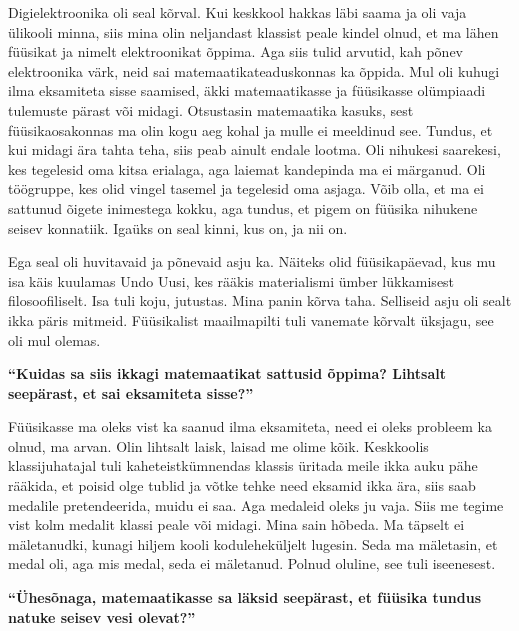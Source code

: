Digielektroonika oli seal kõrval. Kui keskkool hakkas läbi saama ja oli vaja ülikooli minna, siis mina olin neljandast klassist peale kindel olnud, et ma lähen füüsikat ja nimelt elektroonikat õppima. Aga siis tulid arvutid, kah põnev elektroonika värk, neid sai matemaatikateaduskonnas ka õppida. Mul oli kuhugi ilma eksamiteta sisse saamised, äkki matemaatikasse ja füüsikasse olümpiaadi tulemuste pärast või midagi. Otsustasin matemaatika kasuks, sest füüsikaosakonnas ma olin kogu aeg kohal ja mulle ei meeldinud see. Tundus, et kui midagi ära tahta teha, siis peab ainult endale lootma. Oli nihukesi saarekesi, kes tegelesid oma kitsa erialaga, aga laiemat kandepinda ma ei märganud. Oli töögruppe, kes olid vingel tasemel ja tegelesid oma asjaga. Võib olla, et ma ei sattunud õigete inimestega kokku, aga tundus, et pigem on füüsika nihukene seisev konnatiik. Igaüks on seal kinni, kus on, ja nii on. 

Ega seal oli huvitavaid ja põnevaid asju ka. Näiteks olid füüsikapäevad, kus mu isa käis kuulamas Undo Uusi, kes rääkis materialismi ümber lükkamisest filosoofiliselt. Isa tuli koju, jutustas. Mina panin kõrva taha. Selliseid asju oli sealt ikka päris mitmeid. Füüsikalist maailmapilti tuli vanemate kõrvalt üksjagu, see oli mul olemas. 

\textbf{\enquote{Kuidas sa siis ikkagi matemaatikat sattusid õppima? Lihtsalt seepärast, et sai eksamiteta sisse?}}

Füüsikasse ma oleks vist ka saanud ilma eksamiteta, need ei oleks probleem ka olnud, ma arvan. Olin lihtsalt laisk, laisad me olime kõik. Keskkoolis klassijuhatajal tuli kaheteistkümnendas klassis üritada meile ikka auku pähe rääkida, et poisid olge tublid ja võtke tehke need eksamid ikka ära, siis saab medalile pretendeerida, muidu ei saa. Aga medaleid oleks ju vaja. Siis me tegime vist kolm medalit klassi peale või midagi. Mina sain hõbeda. Ma täpselt ei mäletanudki, kunagi hiljem kooli koduleheküljelt lugesin. Seda ma mäletasin, et medal oli, aga mis medal, seda ei mäletanud. Polnud oluline, see tuli iseenesest. 

\textbf{\enquote{Ühesõnaga, matemaatikasse sa läksid seepärast, et füüsika tundus natuke seisev vesi olevat?}}

